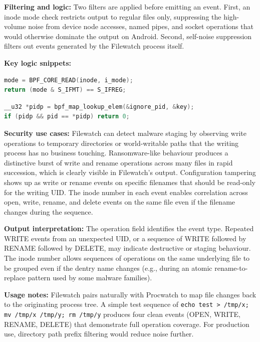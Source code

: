 \documentclass{mnitjaipur}
\begin{document}
\textbf{Filtering and logic:} Two filters are applied before emitting an event. First, an inode mode check restricts output to regular files only, suppressing the high-volume noise from device node accesses, named pipes, and socket operations that would otherwise dominate the output on Android. Second, self-noise suppression filters out events generated by the Filewatch process itself.

\textbf{Key logic snippets:}
\begin{lstlisting}[language=C,caption={Filewatch regular-file filter}]
mode = BPF_CORE_READ(inode, i_mode);
return (mode & S_IFMT) == S_IFREG;
\end{lstlisting}

\begin{lstlisting}[language=C,caption={Filewatch self-noise suppression}]
__u32 *pidp = bpf_map_lookup_elem(&ignore_pid, &key);
if (pidp && pid == *pidp) return 0;
\end{lstlisting}

\textbf{Security use cases:} Filewatch can detect malware staging by observing write operations to temporary directories or world-writable paths that the writing process has no business touching. Ransomware-like behaviour produces a distinctive burst of write and rename operations across many files in rapid succession, which is clearly visible in Filewatch's output. Configuration tampering shows up as write or rename events on specific filenames that should be read-only for the writing UID. The inode number in each event enables correlation across open, write, rename, and delete events on the same file even if the filename changes during the sequence.

\textbf{Output interpretation:} The operation field identifies the event type. Repeated WRITE events from an unexpected UID, or a sequence of WRITE followed by RENAME followed by DELETE, may indicate destructive or staging behaviour. The inode number allows sequences of operations on the same underlying file to be grouped even if the dentry name changes (e.g., during an atomic rename-to-replace pattern used by some malware families).

\textbf{Usage notes:} Filewatch pairs naturally with Procwatch to map file changes back to the originating process tree. A simple test sequence of \texttt{echo test > /tmp/x; mv /tmp/x /tmp/y; rm /tmp/y} produces four clean events (OPEN, WRITE, RENAME, DELETE) that demonstrate full operation coverage. For production use, directory path prefix filtering would reduce noise further.
\end{document}
